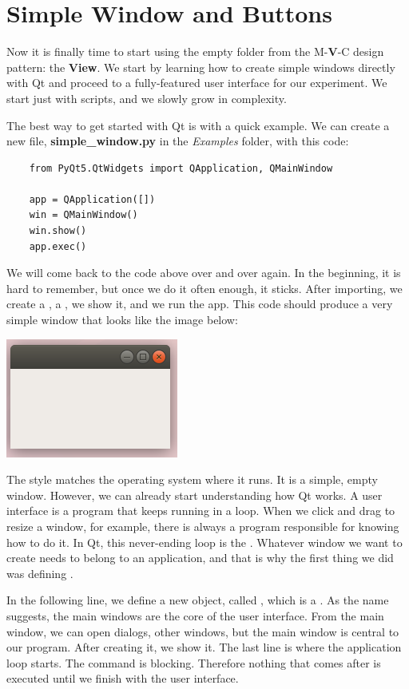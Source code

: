 \section{Simple Window and Buttons}\label{sec:simple-window-andbuttons}
Now it is finally time to start using the empty folder from the M-\textbf{V}-C design pattern: the \textbf{View}. We start by learning how to create simple windows directly with Qt and proceed to a fully-featured user interface for our experiment. We start just with scripts, and we slowly grow in complexity.

The best way to get started with Qt is with a quick example. We can create a new file, \textbf{simple\_window.py} in the \emph{Examples} folder, with this code:

\begin{verbatim}
    from PyQt5.QtWidgets import QApplication, QMainWindow

    app = QApplication([])
    win = QMainWindow()
    win.show()
    app.exec()
\end{verbatim}

We will come back to the code above over and over again. In the beginning, it is hard to remember, but once we do it often enough, it sticks. After importing, we create a , a , we show it, and we run the app. This code should produce a very simple window that looks like the image below:

\begin{center}
    \includegraphics[width=.3\textwidth]{images/Chapter_08/01_simple_window.png}
\end{center}

The style matches the operating system where it runs. It is a simple, empty window. However, we can already start understanding how Qt works. A user interface is a program that keeps running in a loop. When we click and drag to resize a window, for example, there is always a program responsible for knowing how to do it. In Qt, this never-ending loop is the . Whatever window we want to create needs to belong to an application, and that is why the first thing we did was defining .

In the following line, we define a new object, called , which is a . As the name suggests, the main windows are the core of the user interface. From the main window, we can open dialogs, other windows, but the main window is central to our program. After creating it, we show it. The last line is where the application loop starts. The  command is blocking. Therefore nothing that comes after is executed until we finish with the user interface.

